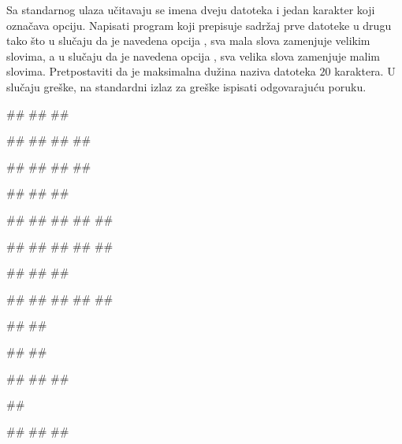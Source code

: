 \begin{Exercise}[label=p3_iv3] 
Sa standarnog ulaza učitavaju se imena dveju datoteka i
jedan karakter koji označava opciju. 
Napisati program koji prepisuje sadržaj prve datoteke u drugu tako što u slučaju da je
navedena opcija , sva mala slova zamenjuje velikim slovima, a u slučaju da je
navedena opcija , sva velika slova zamenjuje malim slovima. 
Pretpostaviti da je maksimalna dužina naziva datoteka $20$ karaktera. 
U slučaju greške, na standardni izlaz za greške ispisati odgovarajuću poruku.

\begin{miditest}
\begin{upotreba}{1}
#\naslovInt#
##
##

##
##
##
##

##
##
##
##
\end{upotreba}
\end{miditest}
\begin{miditest}
\begin{upotreba}{2}
#\naslovInt#
##
##

##
##
##
##
##

##
##
##
##
##
\end{upotreba}
\end{miditest}

\begin{miditest}
\begin{upotreba}{3}
#\naslovInt#
##
##

##
##
##
#\datoteka{\{}#
#\datoteka{\}}#

##
#\datoteka{}#

#\naslovIzlazZaGresku#
##
\end{upotreba}
\end{miditest}
\begin{miditest}
\begin{upotreba}{4}
#\naslovInt#
##
##

##

#\naslovIzlazZaGresku#
##
##
\end{upotreba}
\end{miditest}
\end{Exercise}
